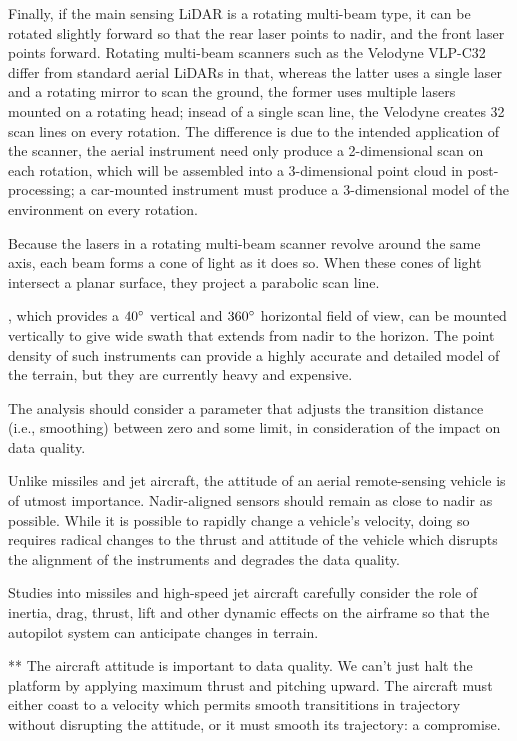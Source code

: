 \documentclass[10pt,a4paper]{report}
\begin{document}
Finally, if the main sensing LiDAR is a rotating multi-beam type, it can be rotated slightly forward so that the rear laser points to nadir, and the front laser points forward. Rotating multi-beam scanners such as the Velodyne VLP-C32 differ from standard aerial LiDARs in that, whereas the latter uses a single laser and a rotating mirror to scan the ground, the former uses multiple lasers mounted on a rotating head; insead of a single scan line, the Velodyne creates 32 scan lines on every rotation. The difference is due to the intended application of the scanner, the aerial instrument need only produce a 2-dimensional scan on each rotation, which will be assembled into a 3-dimensional point cloud in post-processing; a car-mounted instrument must produce a 3-dimensional model of the environment on every rotation.

Because the lasers in a rotating multi-beam scanner revolve around the same axis, each beam forms a cone of light as it does so. When these cones of light intersect a planar surface, they project a parabolic scan line.

, which provides a $40\degree$ vertical and $360\degree$ horizontal field of view, can be mounted vertically to give wide swath that extends from nadir to the horizon. The point density of such instruments can provide a highly accurate and detailed model of the terrain, but they are currently heavy and expensive. 


The analysis should consider a parameter that adjusts the transition distance (i.e., smoothing) between zero and some limit, in consideration of the impact on data quality.

Unlike missiles and jet aircraft, the attitude of an aerial remote-sensing vehicle is of utmost importance. Nadir-aligned sensors should remain as close to nadir as possible. While it is possible to rapidly change a vehicle's velocity, doing so requires radical changes to the thrust and attitude of the vehicle which disrupts the alignment of the instruments and degrades the data quality.



Studies into missiles and high-speed jet aircraft carefully consider the role of inertia, drag, thrust, lift and other dynamic effects on the airframe so that the autopilot system can anticipate changes in terrain. 

** The aircraft attitude is important to data quality. We can't just halt the platform by applying maximum thrust and pitching upward. The aircraft must either coast to a velocity which permits smooth transititions in trajectory without disrupting the attitude, or it must smooth its trajectory: a compromise.
\end{document}
